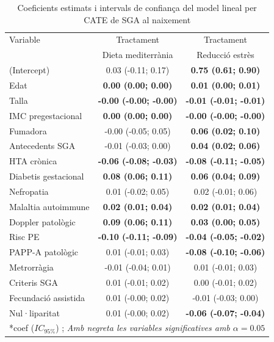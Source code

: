 \documentclass[../main.tex]{subfiles}
\begin{document}
    \begin{table}[H]
        \centering
        \captionsetup{font=small}
        \caption{Coeficients estimats i intervals de confiança del model lineal per CATE de SGA al naixement}
        \label{tab:coef_SGAnaix}
        \centering
        \scriptsize
        \begin{tabular}[t]{p{4cm} c @{\hspace{1cm}} c}
        \toprule
        Variable & Tractament  & Tractament \\
         & Dieta mediterrània & Reducció estrès \\
        \midrule
        (Intercept) & 0.03 (-0.11; 0.17) & \textbf{0.75 (0.61; 0.90)}\\
        Edat & \textbf{0.00 (0.00; 0.00)} & \textbf{0.01 (0.00; 0.01)}\\
        Talla & \textbf{-0.00 (-0.00; -0.00)} & \textbf{-0.01 (-0.01; -0.01)}\\
        IMC pregestacional & \textbf{0.00 (0.00; 0.00)} & \textbf{-0.00 (-0.00; -0.00)}\\
        Fumadora & -0.00 (-0.05; 0.05) & \textbf{0.06 (0.02; 0.10)}\\
        \addlinespace
        Antecedents SGA & -0.01 (-0.03; 0.00) & \textbf{0.04 (0.02; 0.06)}\\
        HTA crònica & \textbf{-0.06 (-0.08; -0.03)} & \textbf{-0.08 (-0.11; -0.05)}\\
        Diabetis gestacional & \textbf{0.08 (0.06; 0.11)} & \textbf{0.06 (0.04; 0.09)}\\
        Nefropatia & 0.01 (-0.02; 0.05) & 0.02 (-0.01; 0.06)\\
        Malaltia autoimmune & \textbf{0.02 (0.01; 0.04)} & \textbf{0.02 (0.01; 0.04)}\\
        \addlinespace
        Doppler patològic & \textbf{0.09 (0.06; 0.11)} & \textbf{0.03 (0.00; 0.05)}\\
        Risc PE & \textbf{-0.10 (-0.11; -0.09)} & \textbf{-0.04 (-0.05; -0.02)}\\
        PAPP-A patològic & 0.01 (-0.01; 0.03) & \textbf{-0.08 (-0.10; -0.06)}\\
        Metrorràgia & -0.01 (-0.04; 0.01) & 0.01 (-0.01; 0.03)\\
        Criteris SGA & 0.01 (-0.01; 0.02) & 0.00 (-0.01; 0.02)\\
        \addlinespace
        Fecundació assistida & 0.01 (-0.00; 0.02) & -0.01 (-0.03; 0.00)\\
        Nul·liparitat & 0.01 (-0.00; 0.02) & \textbf{-0.06 (-0.07; -0.04)}\\
        \bottomrule
        \multicolumn{3}{l}{\rule{0pt}{1em}*coef ($IC_{95\%}$) ; \textit{Amb negreta les variables significatives amb $\alpha=0.05$}}
        \end{tabular}
    \end{table}
\end{document}
